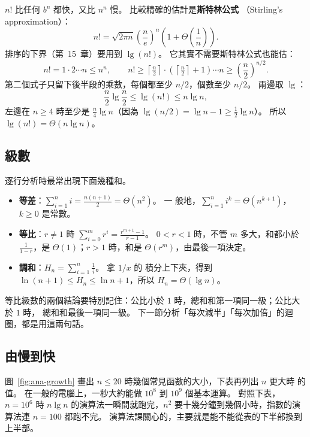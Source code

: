 $n!$ 比任何 $b^n$ 都快，又比 $n^n$ 慢。 比較精確的估計是\textbf{斯特林公式}
（Stirling's approximation）：
\[
n! = \sqrt{2\pi n}\left(\frac{n}{e}\right)^n \left(1 + \Theta\!\left(\frac{1}{n}\right)\right).
\]
排序的下界（第~15~章）要用到 $\lg(n!)$。 它其實不需要斯特林公式也能估：
\[
n! = 1 \cdot 2 \cdots n \le n^n,
\qquad
n! \ge \left\lceil \tfrac{n}{2} \right\rceil \cdot \left(\left\lceil \tfrac{n}{2} \right\rceil + 1\right) \cdots n
\ge \left(\frac{n}{2}\right)^{n/2}.
\]
第二個式子只留下後半段的乘數，每個都至少 $n/2$，個數至少 $n/2$。 兩邊取 $\lg$：
\[
\frac{n}{2} \lg \frac{n}{2} \le \lg(n!) \le n \lg n,
\]
左邊在 $n \ge 4$ 時至少是 $\frac{n}{4}\lg n$（因為 $\lg(n/2) = \lg n - 1 \ge
\frac{1}{2}\lg n$）。 所以 $\lg(n!) = \Theta(n \lg n)$。

\subsection{級數}

逐行分析時最常出現下面幾種和。

\begin{itemize}
\item \textbf{等差}：$\displaystyle\sum_{i=1}^{n} i = \frac{n(n+1)}{2} = \Theta(n^2)$。 一
般地，$\displaystyle\sum_{i=1}^{n} i^k = \Theta(n^{k+1})$，$k \ge 0$ 是常數。
\item \textbf{等比}：$r \ne 1$ 時
$\displaystyle\sum_{i=0}^{m} r^i = \frac{r^{m+1} - 1}{r - 1}$。 $0 < r < 1$ 時，不管
$m$ 多大，和都小於 $\frac{1}{1-r}$，是 $\Theta(1)$；$r > 1$ 時，和是
$\Theta(r^m)$，由最後一項決定。
\item \textbf{調和}：$H_n = \displaystyle\sum_{i=1}^{n} \frac{1}{i}$。 拿 $1/x$ 的
積分上下夾，得到 $\ln(n+1) \le H_n \le \ln n + 1$，所以 $H_n = \Theta(\lg n)$。
\end{itemize}

等比級數的兩個結論要特別記住：公比小於 $1$ 時，總和和第一項同一級；公比大於 $1$ 時，
總和和最後一項同一級。 下一節分析「每次減半」「每次加倍」的迴圈，都是用這兩句話。

\subsection{由慢到快}

圖~\ref{fig:ana-growth} 畫出 $n \le 20$ 時幾個常見函數的大小，下表再列出 $n$ 更大時
的值。 在一般的電腦上，一秒大約能做 $10^8$ 到 $10^9$ 個基本運算。 對照下表，
$n = 10^6$ 時 $n \lg n$ 的演算法一瞬間就跑完，$n^2$ 要十幾分鐘到幾個小時，指數的演
算法連 $n = 100$ 都跑不完。 演算法課關心的，主要就是能不能從表的下半部換到上半部。

